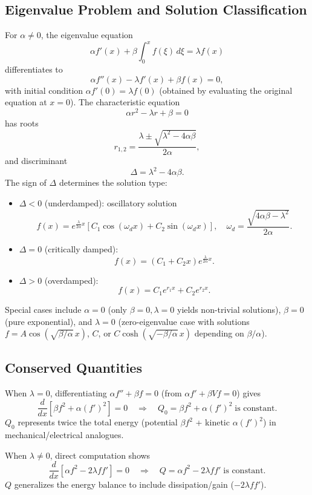\documentclass[11pt]{article}
\begin{document}
\subsection{Eigenvalue Problem and Solution Classification}
For $\alpha \neq 0$, the eigenvalue equation
\[
\alpha f'(x) + \beta \int_0^x f(\xi)\,d\xi = \lambda f(x)
\]
differentiates to
\[
\alpha f''(x) - \lambda f'(x) + \beta f(x) = 0,
\]
with initial condition $\alpha f'(0) = \lambda f(0)$ (obtained by evaluating the original equation at $x=0$). The characteristic equation
\[
\alpha r^2 - \lambda r + \beta = 0
\]
has roots
\[
r_{1,2} = \frac{\lambda \pm \sqrt{\lambda^2 - 4\alpha\beta}}{2\alpha},
\]
and discriminant
\[
\Delta = \lambda^2 - 4\alpha\beta.
\]
The sign of $\Delta$ determines the solution type:
\begin{itemize}
\item $\Delta < 0$ (underdamped): oscillatory solution
  \[
  f(x) = e^{\frac{\lambda}{2\alpha}x}\left[C_1\cos(\omega_d x) + C_2\sin(\omega_d x)\right],
  \quad \omega_d = \frac{\sqrt{4\alpha\beta - \lambda^2}}{2\alpha}.
  \]
\item $\Delta = 0$ (critically damped):
  \[
  f(x) = (C_1 + C_2 x) e^{\frac{\lambda}{2\alpha}x}.
  \]
\item $\Delta > 0$ (overdamped):
  \[
  f(x) = C_1 e^{r_1 x} + C_2 e^{r_2 x}.
  \]
\end{itemize}
Special cases include $\alpha=0$ (only $\beta=0,\lambda=0$ yields non-trivial solutions), $\beta=0$ (pure exponential), and $\lambda=0$ (zero-eigenvalue case with solutions $f = A\cos(\sqrt{\beta/\alpha}\,x)$, $C$, or $C\cosh(\sqrt{-\beta/\alpha}\,x)$ depending on $\beta/\alpha$).

\subsection{Conserved Quantities}
When $\lambda=0$, differentiating $\alpha f'' + \beta f = 0$ (from $\alpha f' + \beta V f = 0$) gives
\[
\frac{d}{dx}\left[\beta f^2 + \alpha (f')^2\right] = 0
\quad\Longrightarrow\quad
Q_0 = \beta f^2 + \alpha (f')^2 \;\text{is constant}.
\]
$Q_0$ represents twice the total energy (potential $\beta f^2$ + kinetic $\alpha (f')^2$) in mechanical/electrical analogues.

When $\lambda \neq 0$, direct computation shows
\[
\frac{d}{dx}\left[\alpha f^2 - 2\lambda f f'\right] = 0
\quad\Longrightarrow\quad
Q = \alpha f^2 - 2\lambda f f' \;\text{is constant}.
\]
$Q$ generalizes the energy balance to include dissipation/gain ($-2\lambda f f'$).
\end{document}
